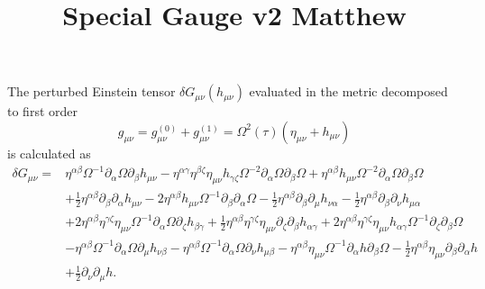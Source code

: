 \documentclass[10pt,letterpaper]{article}
\title{Special Gauge v2 Matthew}
\date{}
\begin{document}
\maketitle
\noindent
The perturbed Einstein tensor $\delta  G_{\mu\nu}( h_{\mu\nu})$ evaluated in the metric decomposed to first order 
\begin{equation}
g_{\mu\nu} = g^{(0)}_{\mu\nu} + g^{(1)}_{\mu\nu} = \Omega^2(\tau)(\eta_{\mu\nu}+h_{\mu\nu})
\end{equation}
is calculated as 
\begin{align}
\delta G_{\mu\nu}={}&\eta^{\alpha \beta} \Omega^{-1} \partial_{\alpha}\Omega \partial_{\beta}h_{\mu \nu}
 -  \eta^{\alpha \gamma} \eta^{\beta \zeta} \eta_{\mu \nu} h_{\gamma \zeta} \Omega^{-2} \partial_{\alpha}\Omega \partial_{\beta}\Omega
 + \eta^{\alpha \beta} h_{\mu \nu} \Omega^{-2} \partial_{\alpha}\Omega \partial_{\beta}\Omega\nonumber\\
& + \tfrac{1}{2} \eta^{\alpha \beta} \partial_{\beta}\partial_{\alpha}h_{\mu \nu}
 - 2 \eta^{\alpha \beta} h_{\mu \nu} \Omega^{-1} \partial_{\beta}\partial_{\alpha}\Omega
 -  \tfrac{1}{2} \eta^{\alpha \beta} \partial_{\beta}\partial_{\mu}h_{\nu \alpha}
 -  \tfrac{1}{2} \eta^{\alpha \beta} \partial_{\beta}\partial_{\nu}h_{\mu \alpha}\nonumber\\
& + 2 \eta^{\alpha \beta} \eta^{\gamma \zeta} \eta_{\mu \nu} \Omega^{-1} \partial_{\alpha}\Omega \partial_{\zeta}h_{\beta \gamma}
 + \tfrac{1}{2} \eta^{\alpha \beta} \eta^{\gamma \zeta} \eta_{\mu \nu} \partial_{\zeta}\partial_{\beta}h_{\alpha \gamma}
 + 2 \eta^{\alpha \beta} \eta^{\gamma \zeta} \eta_{\mu \nu} h_{\alpha \gamma} \Omega^{-1} \partial_{\zeta}\partial_{\beta}\Omega\nonumber\\
& -  \eta^{\alpha \beta} \Omega^{-1} \partial_{\alpha}\Omega \partial_{\mu}h_{\nu \beta}
 -  \eta^{\alpha \beta} \Omega^{-1} \partial_{\alpha}\Omega \partial_{\nu}h_{\mu \beta}- \eta^{\alpha \beta} \eta_{\mu \nu} \Omega^{-1} \partial_{\alpha}h \partial_{\beta}\Omega -  \tfrac{1}{2} \eta^{\alpha \beta} \eta_{\mu \nu} \partial_{\beta}\partial_{\alpha}h\nonumber \\
& + \tfrac{1}{2} \partial_{\nu}\partial_{\mu}h.
\end{align}
\end{document}
